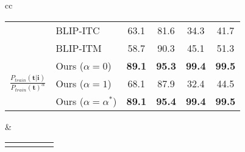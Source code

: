 \documentclass{article} \usepackage{iclr2024_conference,times}
\begin{document}
\begin{table}[h]
{\begin{tabular}{cc}
\begin{NiceTabular}{llcccc}
      & BLIP-ITC & 63.1 & 81.6 &	34.3 &	41.7 \\
      & BLIP-ITM & 58.7 &	90.3 &	45.1 & 51.3 \\ \hline
       & Ours ($\alpha = 0$) & {\bf 89.1} &	{\bf 95.3} &	{\bf 99.4} &	{\bf 99.5} \\
      & Ours ($\alpha = 1$) & 68.1 &	87.9 &	32.4 &	44.5 \\
      & Ours ($\alpha = \alpha^\ast$) & {\bf 89.1} &  {\bf 95.4} &	{\bf 99.4} &	{\bf 99.5} \\
     \bottomrule
\end{NiceTabular}
        & \quad
        
        \begin{NiceTabular}{llccc}
        \CodeBefore
        \Body
        

\end{NiceTabular}
\end{tabular}}
\end{table}
\end{document}
